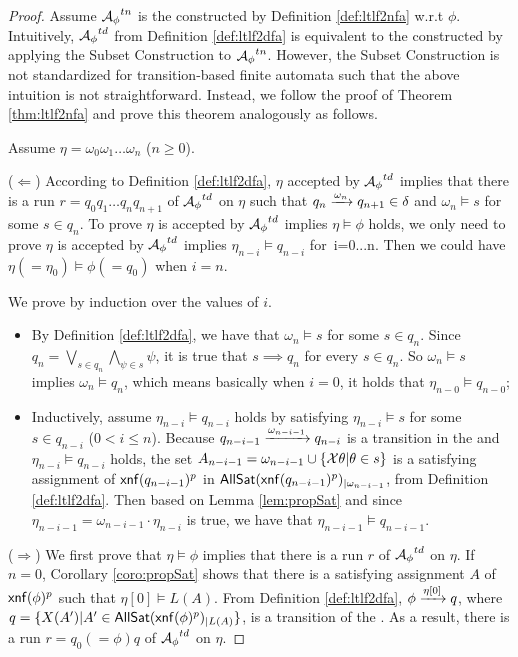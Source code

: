 \begin{proof}
Assume ${\mathcal{A}_{\phi}}^{tn}$ is the \TNFA constructed by Definition \ref{def:ltlf2nfa} w.r.t $\phi$. Intuitively, ${\mathcal{A}_{\phi}}^{td}$ from Definition \ref{def:ltlf2dfa} is equivalent to the \TDFA constructed by applying the Subset Construction to ${\mathcal{A}_{\phi}}^{tn}$. However, the Subset Construction is not standardized for transition-based finite automata such that the above intuition is not straightforward. Instead, we follow the proof of Theorem \ref{thm:ltlf2nfa} and prove this theorem analogously as follows.

Assume $\eta = \omega_0\omega_1\ldots\omega_n$ ($n\geq 0$). 

($\Leftarrow$) 
According to Definition \ref{def:ltlf2dfa},  $\eta$ accepted by ${\mathcal{A}_{\phi}}^{td}$ implies that there is a run $r=q_0q_1\ldots q_n q_{n+1}$ of ${\mathcal{A}_{\phi}}^{td}$ on $\eta$ such that $q_{n}\xrightarrow[]{\omega_{n}}q_{n+1} \in \delta$ and $\omega_n\models s$ for some $s\in q_n$.
To prove $\eta$ is accepted by ${\mathcal{A}_{\phi}}^{td}$ implies $\eta\models\phi$ holds, we only need to prove $\eta$ is accepted by ${\mathcal{A}_{\phi}}^{td}$ implies $\eta_{n-i}\models q_{n-i}$ for\ i=0...n. Then we could have $\eta (=\eta_0)\models \phi (=q_0)$ when $i=n$.

We prove by induction over the values of $i$.
\begin{itemize}
	\item By Definition \ref{def:ltlf2dfa}, we have that $\omega_n\models s$ for some $s\in q_n$. Since $q_n = \bigvee_{s\in q_n}\bigwedge_{\psi\in s}\psi$, it is true that $s\implies q_n$ for every $s\in q_n$. So $\omega_n\models s$ implies $\omega_n\models q_n$, which means basically when $i = 0$, it holds that $\eta_{n-0}\models q_{n-0}$;
	\item Inductively, assume $\eta_{n-i}\models q_{n-i}$ holds by satisfying $\eta_{n-i}\models s$ for some $s\in q_{n-i}$ ($0<i\leq n$). Because $q_{n-i-1}\xrightarrow[]{\omega_{n-i-1}}q_{n-i}$ is a transition in the \TDFA and $\eta_{n-i}\models q_{n-i}$ holds, the set $A_{n-i-1} = \omega_{n-i-1}\cup \{\mathcal{X}\theta | \theta\in s\}$ is a satisfying assignment of ${\sf xnf}(q_{n-i-1})^p$ in ${\sf AllSat}({\sf xnf}(q_{n-i-1})^p)_{|\omega_{n-i-1}}$, from Definition \ref{def:ltlf2dfa}. Then based on Lemma \ref{lem:propSat} and since $\eta_{n-i-1}=\omega_{n-i-1}\cdot\eta_{n-i}$ is true, we have that $\eta_{n-i-1}\models q_{n-i-1}$.
\end{itemize}

($\Rightarrow$) We first prove that $\eta\models\phi$ implies that there is a run $r$ of ${\mathcal{A}_{\phi}}^{td}$ on $\eta$. 
If $n = 0$, Corollary \ref{coro:propSat} shows that there is a satisfying assignment $A$ of ${\sf xnf}(\phi)^p$ such that $\eta[0]\models L(A)$. From Definition \ref{def:ltlf2dfa}, $\phi\xrightarrow[]{\eta[0]}q$, where $q=\{X(A') | A'\in{\sf AllSat}({\sf xnf}(\phi)^p)_{|L(A)}\}$, is a transition of the \TDFA. As a result, there is a run $r=q_0(=\phi)q$ of ${\mathcal{A}_{\phi}}^{td}$ on $\eta$.
 

\end{proof}

